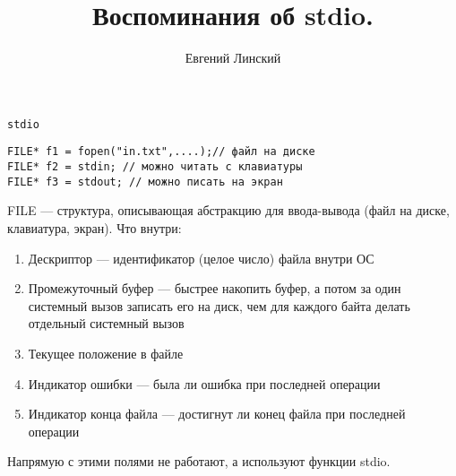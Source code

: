 \documentclass[pdf, 10pt, unicode]{beamer}
\title{Воспоминания об stdio.}
\author{Евгений Линский}
\date{}
\begin{document}
\begin{frame}
  \vspace{1cm}
  \large
  \maketitle
  \thispagestyle{empty}
  \vspace{1cm}
  \date{}
\end{frame}

\begin{frame}[fragile]{{\tt stdio}}
\begin{verbatim}
FILE* f1 = fopen("in.txt",....);// файл на диске
FILE* f2 = stdin; // можно читать с клавиатуры
FILE* f3 = stdout; // можно писать на экран
\end{verbatim}
FILE --- структура, описывающая абстракцию для ввода-вывода (файл на диске, клавиатура, экран).
Что внутри:
\begin{enumerate}
  \item Дескриптор --- идентификатор (целое число) файла внутри ОС
  \item Промежуточный буфер --- быстрее накопить буфер, а потом за один системный вызов записать его на диск, чем для каждого байта делать отдельный системный вызов
  \item Текущее положение в файле
  \item Индикатор ошибки --- была ли ошибка при последней операции
  \item Индикатор конца файла --- достигнут ли конец файла при последней операции
\end{enumerate}
Напрямую с этими полями не работают, а используют функции stdio.
\end{frame}
\end{document}
